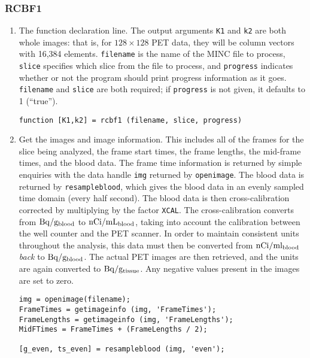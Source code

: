\documentclass[12pt]{article}
\def\code#1{{\tt #1}}
\begin{document}
\subsubsection{RCBF1}
\label{sec:rcbf1_listing}

\begin{enumerate}

\item The function declaration line.  The output arguments \code{K1}
  and \code{k2} are both whole images: that is, for $128 \times 128$
  PET data, they will be column vectors with 16,384 elements.
  \code{filename} is the name of the MINC file to process,
  \code{slice} specifies which slice from the file to process, and
  \code{progress} indicates whether or not the program should print
  progress information as it goes.  \code{filename} and \code{slice}
  are both required; if \code{progress} is not given, it defaults to 1
  (``true'').  
\begin{verbatim}
function [K1,k2] = rcbf1 (filename, slice, progress)
\end{verbatim}

\item Get the images and image information.  This includes all of the
  frames for the slice being analyzed, the frame start times, the
  frame lengths, the mid-frame times, and the blood data.  The frame
  time information is returned by simple enquiries with the data
  handle \code{img} returned by \code{openimage}.  The blood data is
  returned by \code{resampleblood}, which gives the blood data in an
  evenly sampled time domain (every half second).  The blood data is
  then cross-calibration corrected by multiplying by the factor
  \code{XCAL}.  The cross-calibration converts from ${\rm Bq} /
  {\rm g_{blood}}$ to ${\rm nCi} / {\rm mL_{blood}}$, taking into
  account the calibration between the well counter and the PET
  scanner.  In order to maintain consistent units throughout the
  analysis, this data must then be converted from ${\rm nCi / ml_{blood}}$
  {\em back} to ${\rm Bq} / {\rm g_{blood}}$.  The actual PET
  images are then retrieved, and the units are again converted to
  ${\rm Bq} / {\rm g_{tissue}}$.  Any negative values present in
  the images are set to zero.
\begin{verbatim}
img = openimage(filename);
FrameTimes = getimageinfo (img, 'FrameTimes');
FrameLengths = getimageinfo (img, 'FrameLengths');
MidFTimes = FrameTimes + (FrameLengths / 2);

[g_even, ts_even] = resampleblood (img, 'even');


\end{verbatim}
\end{enumerate}
\end{document}
